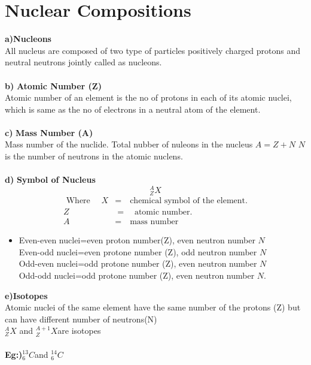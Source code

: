 \section{Nuclear Compositions}
\textbf{a)}\quad \textbf{Nucleons}\\All nucleus are composed of two type of particles positively charged protons and neutral neutrons jointly called as nucleons.\\\\
\textbf{b)}\quad\textbf{ Atomic Number (Z)}\\
 Atomic number of an element is the no of protons in each of its atomic nuclei, which is same as the no of electrons in a neutral atom of the element.\\\\
 \textbf{c)}\quad\textbf{ Mass Number (A)}\\
 Mass number of the nuclide. Total nubber of nuleons in the nucleus $A=Z+N$ $N$ is the number of neutrons in the atomic nuclens.\\\\
 \textbf{d)}\quad\textbf{ Symbol of Nucleus}\\
 $$^A_ZX$$
 \begin{align*}
\text{ Where }\quad X&=\quad \text{chemical symbol of the element.}\\
 Z&=\quad \text{atomic number}.\\
 A&= \quad \text{mass number}
 \end{align*}
 \begin{itemize}
 	\item Even-even nuclei=even proton number(Z), even neutron number $N$\\
 	Even-odd nuclei=even protone number (Z), odd neutron number $N$\\
 	Odd-even nuclei=odd protone number (Z), even neutron number $N$\\
 	Odd-odd nuclei=odd protone number (Z), even neutron number $N$.\\
 \end{itemize}
\textbf{e)}\quad\textbf{Isotopes}\\
Atomic nuclei of the same element have the same number of the protons (Z) but can have different number of neutrons(N)\\
$^A_ZX$ \quad and \quad $^{A+1}_ZX$\quad  are isotopes\\\\
\textbf{Eg:)}\quad $^{13}_6C$\quad and \quad $^{14}_6 C$\\\\
